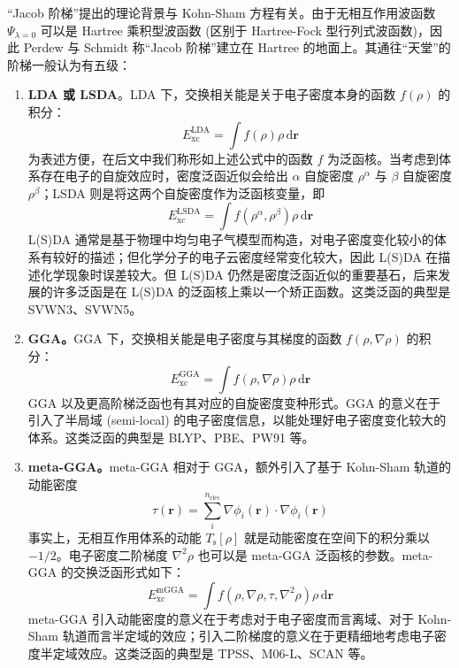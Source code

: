 “Jacob 阶梯”提出的理论背景与 Kohn-Sham 方程有关。由于无相互作用波函数 $\Psi_{\lambda = 0}$ 可以是 Hartree 乘积型波函数 (区别于 Hartree-Fock 型行列式波函数)，因此 Perdew 与 Schmidt 称“Jacob 阶梯”建立在 Hartree 的地面上。其通往“天堂”的阶梯一般认为有五级：
\begin{enumerate}[nosep]
  \item \textbf{LDA 或 LSDA}。LDA 下，交换相关能是关于电子密度本身的函数 $f(\rho)$ 的积分：
  \begin{equation}
    E_\mathrm{xc}^\mathrm{LDA} = \int f(\rho) \rho \, \mathrm{d} \bm{r}
  \end{equation}
  为表述方便，在后文中我们称形如上述公式中的函数 $f$ 为泛函核。当考虑到体系存在电子的自旋效应时，密度泛函近似会给出 $\alpha$ 自旋密度 $\rho^\alpha$ 与 $\beta$ 自旋密度 $\rho^\beta$；LSDA 则是将这两个自旋密度作为泛函核变量，即
  \begin{equation}
    E_\mathrm{xc}^\mathrm{LSDA} = \int f(\rho^\alpha, \rho^\beta) \rho \, \mathrm{d} \bm{r}
  \end{equation}
  L(S)DA 通常是基于物理中均匀电子气模型而构造，对电子密度变化较小的体系有较好的描述；但化学分子的电子云密度经常变化较大，因此 L(S)DA 在描述化学现象时误差较大。但 L(S)DA 仍然是密度泛函近似的重要基石，后来发展的许多泛函是在 L(S)DA 的泛函核上乘以一个矫正函数。这类泛函的典型是 SVWN3\cite{Dirac-Dirac.MPCPS.1930, Bloch-Bloch.ZP.1929, Vosko-Nusair.CJP.1980}、SVWN5\cite{Dirac-Dirac.MPCPS.1930, Bloch-Bloch.ZP.1929, Vosko-Nusair.CJP.1980}。
  
  \item \textbf{GGA。}GGA 下，交换相关能是电子密度与其梯度的函数 $f(\rho, \nabla \rho)$ 的积分：
  \begin{equation}
    E_\mathrm{xc}^\mathrm{GGA} = \int f(\rho, \nabla \rho) \rho \, \mathrm{d} \bm{r}
  \end{equation}
  GGA 以及更高阶梯泛函也有其对应的自旋密度变种形式。GGA 的意义在于引入了半局域 (semi-local) 的电子密度信息，以能处理好电子密度变化较大的体系。这类泛函的典型是 BLYP\cite{Becke-Becke.PRA.1988, Lee-Parr.PRB.1988}、PBE\cite{Perdew-Ernzerhof.PRL.1996}、PW91\cite{Perdew-Fiolhais.PRB.1992} 等。

  \item \textbf{meta-GGA。}meta-GGA 相对于 GGA，额外引入了基于 Kohn-Sham 轨道的动能密度
  \begin{equation*}
    \tau (\bm{r}) = \sum_i^{n_\mathrm{elec}} \nabla \phi_i (\bm{r}) \cdot \nabla \phi_i (\bm{r})
  \end{equation*}
  事实上，无相互作用体系的动能 $T_\mathrm{s} [\rho]$ 就是动能密度在空间下的积分乘以 $-1/2$。电子密度二阶梯度 $\nabla^2 \rho$ 也可以是 meta-GGA 泛函核的参数。meta-GGA 的交换泛函形式如下：
  \begin{equation}
    E_\mathrm{xc}^\mathrm{mGGA} = \int f(\rho, \nabla \rho, \tau, \nabla^2 \rho) \rho \, \mathrm{d} \bm{r}
  \end{equation}
  meta-GGA 引入动能密度的意义在于考虑对于电子密度而言离域、对于 Kohn-Sham 轨道而言半定域的效应；引入二阶梯度的意义在于更精细地考虑电子密度半定域效应。这类泛函的典型是 TPSS\cite{Tao-Scuseria.PRL.2003, Perdew-Scuseria.JCP.2004}、M06-L\cite{Zhao-Truhlar.TCA.2008}、SCAN\cite{Sun-Perdew.PRL.2015} 等。


\end{enumerate}
